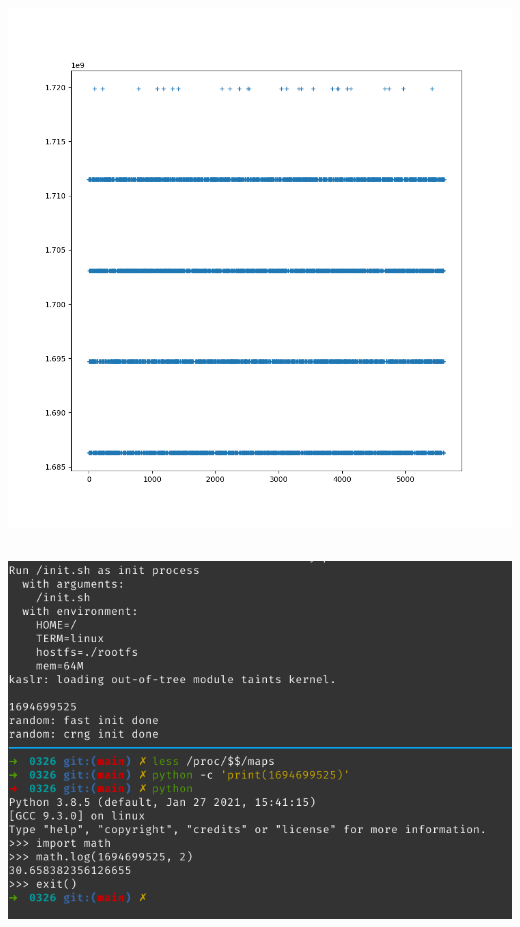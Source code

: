 \documentclass{beamer}
\begin{document}
\begin{CJK*}{UTF8}{bsmi}
\begin{frame}
\begin{columns}
\begin{column}{.5\textwidth}
                \includegraphics[width=\textwidth]{kaslr.png}
            \end{column}
        \end{columns}
    \end{frame}

    \begin{frame}
        \includegraphics[width=\textwidth]{k32_1G.png}
    \end{frame}


\end{CJK*}
\end{document}
